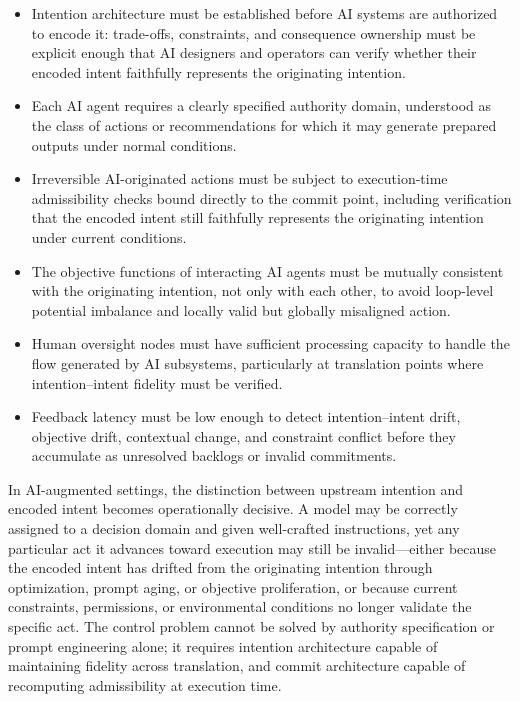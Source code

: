 \documentclass[12pt]{article}
\begin{document}
\begin{itemize}
  \item Intention architecture must be established before AI systems are
    authorized to encode it: trade-offs, constraints, and consequence
    ownership must be explicit enough that AI designers and operators can
    verify whether their encoded intent faithfully represents the originating
    intention.
  \item Each AI agent requires a clearly specified authority domain,
    understood as the class of actions or recommendations for which it may
    generate prepared outputs under normal conditions.
  \item Irreversible AI-originated actions must be subject to execution-time
    admissibility checks bound directly to the commit point, including
    verification that the encoded intent still faithfully represents the
    originating intention under current conditions.
  \item The objective functions of interacting AI agents must be mutually
    consistent with the originating intention, not only with each other, to
    avoid loop-level potential imbalance and locally valid but globally
    misaligned action.
  \item Human oversight nodes must have sufficient processing capacity to
    handle the flow generated by AI subsystems, particularly at translation
    points where intention--intent fidelity must be verified.
  \item Feedback latency must be low enough to detect intention--intent
    drift, objective drift, contextual change, and constraint conflict before
    they accumulate as unresolved backlogs or invalid commitments.
\end{itemize}

In AI-augmented settings, the distinction between upstream intention and
encoded intent becomes operationally decisive. A model may be correctly
assigned to a decision domain and given well-crafted instructions, yet any
particular act it advances toward execution may still be invalid---either
because the encoded intent has drifted from the originating intention through
optimization, prompt aging, or objective proliferation, or because current
constraints, permissions, or environmental conditions no longer validate the
specific act. The control problem cannot be solved by authority specification
or prompt engineering alone; it requires intention architecture capable of
maintaining fidelity across translation, and commit architecture capable of
recomputing admissibility at execution time.
\end{document}
